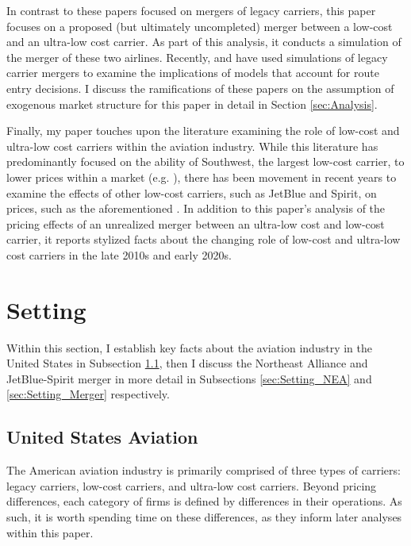 \documentclass{article}
\begin{document}
    In contrast to these papers focused on mergers of legacy carriers, this paper focuses on a proposed (but ultimately uncompleted) merger between a low-cost and an ultra-low cost carrier. As part of this analysis, it conducts a simulation of the merger of these two airlines. Recently, \citet{ciliberto_market_2021} and \citet{li_repositioning_2022} have used simulations of legacy carrier mergers to examine the implications of models that account for route entry decisions. I discuss the ramifications of these papers on the assumption of exogenous market structure for this paper in detail in Section \ref{sec:Analysis}. 
	
	Finally, my paper touches upon the literature examining the role of low-cost and ultra-low cost carriers within the aviation industry. While this literature has predominantly focused on the ability of Southwest, the largest low-cost carrier, to lower prices within a market (e.g. \citet{windle_short_1995, morrison_actual_2001,  goolsbee_how_2008}), there has been movement in recent years to examine the effects of other low-cost carriers, such as JetBlue and Spirit, on prices, such as the aforementioned \citet{shrago_spirit_2024}. In addition to this paper's analysis of the pricing effects of an unrealized merger between an ultra-low cost and low-cost carrier, it reports stylized facts about the changing role of low-cost and ultra-low cost carriers in the late 2010s and early 2020s.  
	
	\section{Setting}
	\label{sec:Setting}
	
	Within this section, I establish key facts about the aviation industry in the United States in Subsection \ref{sec:Setting_Aviation}, then I discuss the Northeast Alliance and JetBlue-Spirit merger in more detail in Subsections \ref{sec:Setting_NEA} and \ref{sec:Setting_Merger} respectively.
	
	\subsection{United States Aviation}
	\label{sec:Setting_Aviation}
	The American aviation industry is primarily comprised of three types of carriers: legacy carriers, low-cost carriers, and ultra-low cost carriers. Beyond pricing differences, each category of firms is defined by differences in their operations. As such, it is worth spending time on these differences, as they inform later analyses within this paper. %
	
\end{document}
